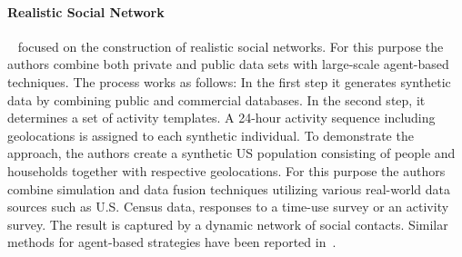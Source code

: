 
\paragraph{Realistic Social Network}
~\cite{Barrett:2009:GAL:1995456.1995598} focused on the construction of
realistic social networks. For this purpose the authors combine both
private and public data sets with large-scale agent-based techniques. The process works as
follows: In the first step it generates  synthetic data by combining public and
commercial databases. In the second step, it determines a set of activity
templates. A 24-hour activity sequence including geolocations is assigned to
each synthetic individual. To demonstrate the approach, the authors create a
synthetic US population consisting of people and households together with
respective geolocations. For this purpose the authors combine simulation and
data fusion techniques utilizing various real-world data sources such as U.S.
Census data, responses to a time-use survey or an activity survey.
The result is captured by a dynamic network of social contacts. Similar methods for
agent-based strategies have been reported
in~\cite{Bernstein:2013:SAS:2499604.2499609}.

